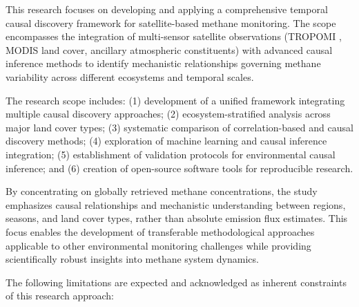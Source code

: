 This research focuses on developing and applying a comprehensive temporal causal discovery framework for satellite-based methane monitoring. The scope encompasses the integration of multi-sensor satellite observations (TROPOMI , MODIS land cover, ancillary atmospheric constituents) with advanced causal inference methods to identify mechanistic relationships governing methane variability across different ecosystems and temporal scales.

The research scope includes: (1) development of a unified framework integrating multiple causal discovery approaches; (2) ecosystem-stratified analysis across major land cover types; (3) systematic comparison of correlation-based and causal discovery methods; (4) exploration of machine learning and causal inference integration; (5) establishment of validation protocols for environmental causal inference; and (6) creation of open-source software tools for reproducible research.

By concentrating on globally retrieved methane concentrations, the study emphasizes causal relationships and mechanistic understanding between regions, seasons, and land cover types, rather than absolute emission flux estimates. This focus enables the development of transferable methodological approaches applicable to other environmental monitoring challenges while providing scientifically robust insights into methane system dynamics.

The following limitations are expected and acknowledged as inherent constraints of this research approach:

